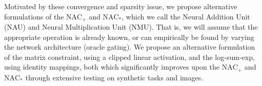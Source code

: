 Motivated by these convergence and sparsity issue, we propose alternative formulations of the $\text{NAC}_{\text{+}}$ and $\text{NAC}_{\text{*}}$, which we call the Neural Addition Unit (NAU) and Neural Multiplication Unit (NMU).
That is, we will assume that the appropriate operation is already known, or can empirically be found by varying the network architecture (oracle gating).
We propose an alternative formulation of the matrix constraint, using a clipped linear activation, and the log-sum-exp, using identity mappings, both which significantly improves upon the $\text{NAC}_{\text{+}}$ and $\text{NAC}_{\text{*}}$ through extensive testing on synthetic tasks and images.









